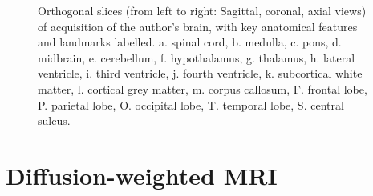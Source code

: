 \begin{figure}[hbt!]
  
  \caption[Neuroanatomical landmarks on $T_1$-weighted MRI]{Orthogonal slices (from left to right: Sagittal, coronal, axial views) of  acquisition of the author's brain, with key anatomical features and landmarks labelled. a. spinal cord, b. medulla, c. pons, d. midbrain, e. cerebellum, f. hypothalamus, g. thalamus, h. lateral ventricle, i. third ventricle, j. fourth ventricle, k. subcortical white matter, l. cortical grey matter, m. corpus callosum, F. frontal lobe, P. parietal lobe, O. occipital lobe, T. temporal lobe, S. central sulcus.}
  \label{fig:ortho}
\end{figure}

\section{Diffusion-weighted MRI}\label{sec:dmri}


